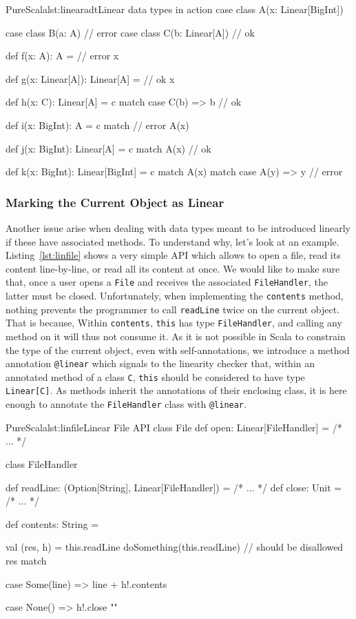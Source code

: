 \documentclass[a4paper,twoside]{article}
\newcommand{\RefCode}[1]{Listing~\ref{#1}}
\newcommand{\stt}[1]{\texttt{\small{#1}}}
\begin{document}
\begin{Code}{PureScala}{lst:linearadt}{Linear data types in action}
case class A(x: Linear[BigInt])

case class B(a: A)          // error
case class C(b: Linear[A])  // ok

def f(x: A): A = { // error
  x
}

def g(x: Linear[A]): Linear[A] = { // ok
  x
}

def h(x: C): Linear[A] = c match {
  case C(b) => b // ok
}

def i(x: BigInt): A = c match { // error
  A(x)
}

def j(x: BigInt): Linear[A] = c match {
  A(x) // ok
}

def k(x: BigInt): Linear[BigInt] = c match {
  A(x) match {
    case A(y) => y // error
  }
}
\end{Code}

\subsubsection{Marking the Current Object as Linear}

Another issue arise when dealing with data types meant to be introduced linearly if these have associated methods. To understand why, let's look at an example. \RefCode{lst:linfile} shows a very simple API which allows to open a file, read its content line-by-line, or read all its content at once. We would like to make sure that, once a user opens a \stt{File} and receives the associated \stt{FileHandler}, the latter must be closed. Unfortunately, when implementing the \stt{contents} method, nothing prevents the programmer to call \stt{readLine} twice on the current object. That is because, Within \stt{contents}, \stt{this} has type \stt{FileHandler}, and calling any method on it will thus not consume it. As it is not possible in Scala to constrain the type of the current object, even with self-annotations, we introduce a method annotation \stt{@linear} which signals to the linearity checker that, within an annotated method of a class \stt{C}, \stt{this} should be considered to have type \stt{Linear[C]}. As methods inherit the annotations of their enclosing class, it is here enough to annotate the \stt{FileHandler} class with \stt{@linear}.

\begin{Code}{PureScala}{lst:linfile}{Linear File API}
class File {
  def open: Linear[FileHandler] = /* ... */
}

class FileHandler {
  def readLine: (Option[String], Linear[FileHandler]) = /* ... */
  def close: Unit = /* ... */
  
  def contents: String = {
    val (res, h) = this.readLine
    doSomething(this.readLine) // should be disallowed
    res match {
      case Some(line) =>
        line + h!.contents

      case None() =>
        h!.close
        ""
    }
  }
}
\end{Code}
\end{document}

